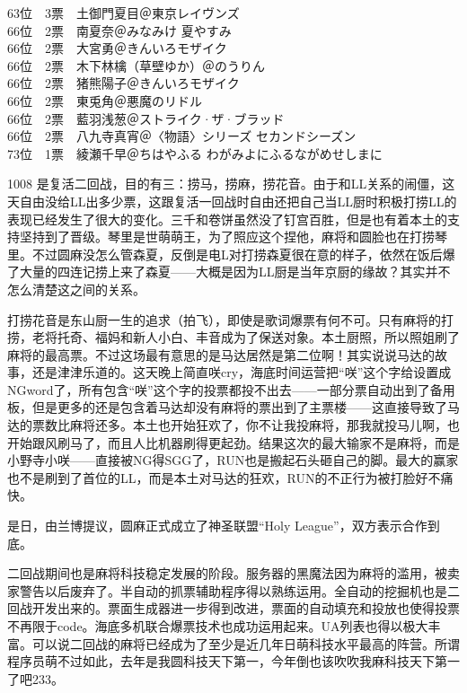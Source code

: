 {    63位　3票　土御門夏目＠東京レイヴンズ                                   \\
    66位　2票　南夏奈＠みなみけ 夏やすみ                                    \\
    66位　2票　大宮勇＠きんいろモザイク                                     \\
    66位　2票　木下林檎（草壁ゆか）＠のうりん                               \\
    66位　2票　猪熊陽子＠きんいろモザイク                                   \\
    66位　2票　東兎角＠悪魔のリドル                                         \\
    66位　2票　藍羽浅葱＠ストライク·ザ·ブラッド                           \\
    66位　2票　八九寺真宵＠〈物語〉シリーズ セカンドシーズン                \\
    73位　1票　綾瀬千早＠ちはやふる わがみよにふるながめせしまに
}

1008 是复活二回战，目的有三：捞马，捞麻，捞花音。由于和LL关系的闹僵，这天自由没给LL出多少票，这跟复活一回战时自由还把自己当LL厨时积极打捞LL的表现已经发生了很大的变化。三千和卷饼虽然没了钉宫百胜，但是也有着本土的支持坚持到了晋级。琴里是世萌萌王，为了照应这个捏他，麻将和圆脸也在打捞琴里。不过圆麻没怎么管森夏，反倒是电L对打捞森夏很在意的样子，依然在饭后爆了大量的四连记捞上来了森夏——大概是因为LL厨是当年京厨的缘故？其实并不怎么清楚这之间的关系。

打捞花音是东山厨一生的追求（拍飞），即使是歌词爆票有何不可。只有麻将的打捞，老将托奇、福妈和新人小白、丰音成为了保送对象。本土厨照，所以照姐刷了麻将的最高票。不过这场最有意思的是马达居然是第二位啊！其实说说马达的故事，还是津津乐道的。这天晚上简直咲cry，海底时间运营把“咲”这个字给设置成NGword了，所有包含“咲”这个字的投票都投不出去——一部分票自动出到了备用板，但是更多的还是包含着马达却没有麻将的票出到了主票楼——这直接导致了马达的票数比麻将还多。本土也开始狂欢了，你不让我投麻将，那我就投马儿啊，也开始跟风刷马了，而且人比机器刷得更起劲。结果这次的最大输家不是麻将，而是小野寺小咲——直接被NG得SGG了，RUN也是搬起石头砸自己的脚。最大的赢家也不是刷到了首位的LL，而是本土对马达的狂欢，RUN的不正行为被打脸好不痛快。

是日，由兰博提议，圆麻正式成立了神圣联盟“Holy League”，双方表示合作到底。

二回战期间也是麻将科技稳定发展的阶段。服务器的黑魔法因为麻将的滥用，被卖家警告以后废弃了。半自动的抓票辅助程序得以熟练运用。全自动的挖掘机也是二回战开发出来的。票面生成器进一步得到改进，票面的自动填充和投放也使得投票不再限于code。海底多机联合爆票技术也成功运用起来。UA列表也得以极大丰富。可以说二回战的麻将已经成为了至少是近几年日萌科技水平最高的阵营。所谓程序员萌不过如此，去年是我圆科技天下第一，今年倒也该吹吹我麻科技天下第一了吧233。

